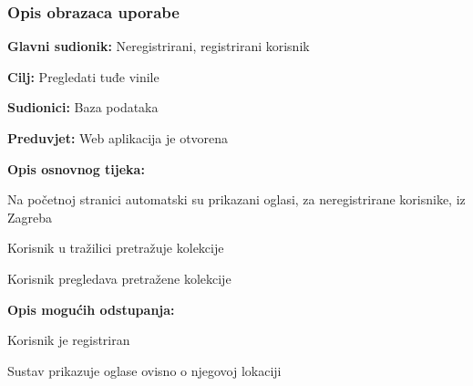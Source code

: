 				
				\subsubsection{Opis obrazaca uporabe}
					

				\noindent {}
					\begin{packed_item}
	
						\item \textbf{Glavni sudionik: }Neregistrirani, registrirani korisnik
						\item  \textbf{Cilj:} Pregledati tuđe vinile
						\item  \textbf{Sudionici:} Baza podataka
						\item  \textbf{Preduvjet:} Web aplikacija je otvorena
						\item  \textbf{Opis osnovnog tijeka:}
						
						\item[] \begin{packed_enum}
	
							\item Na početnoj stranici automatski su prikazani oglasi, za neregistrirane korisnike, iz Zagreba
							\item Korisnik u tražilici pretražuje kolekcije
							\item Korisnik pregledava pretražene kolekcije

						\end{packed_enum}
						
						\item  \textbf{Opis mogućih odstupanja:}
						
						\item[] \begin{packed_item}
	
							\item[1.a] Korisnik je registriran
								\begin{packed_item}
									\item Sustav prikazuje oglase ovisno o njegovoj lokaciji
								\end{packed_item}
							
						\end{packed_item}						
					\end{packed_item}
					
